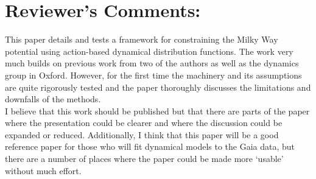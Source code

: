 \documentclass[10pt,a4paper]{article}
\begin{document}
\section{Reviewer's Comments:}

This paper details and tests a framework for constraining the Milky Way potential
using action-based dynamical distribution functions. The work very much builds on
previous work from two of the authors as well as the dynamics group in Oxford.
However, for the first time the machinery and its assumptions are quite rigorously
tested and the paper thoroughly discusses the limitations and downfalls of the
methods.\\

I believe that this work should be published but that there are parts of the paper
where the presentation could be clearer and where the discussion could be expanded
or reduced. Additionally, I think that this paper will be a good reference paper for
those who will fit dynamical models to the Gaia data, but there are a number of
places where the paper could be made more `usable' without much effort.\\
\end{document}
